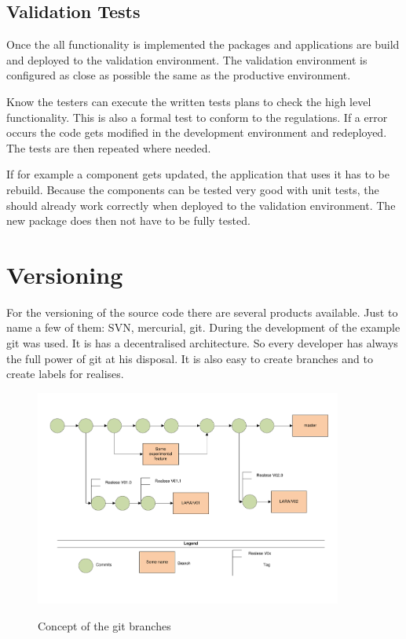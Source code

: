 \documentclass[paper=a4,twoside=false,BCOR=0mm,DIV=calc,fontsize=12pt]{scrartcl}
\begin{document}
\subsection{Validation Tests}
Once the all functionality is implemented the packages and applications are build and deployed to the validation environment. The validation environment is configured as 
close as possible the same as the productive environment.

Know the testers can execute the written tests plans to check the high level functionality. This is also a formal test to conform to the regulations. If a error occurs 
the code gets modified in the development environment and redeployed. The tests are then repeated where needed.

If for example a component gets updated, the application that uses it has to be rebuild. Because the components can be tested very good with unit tests, the should already work correctly when deployed to the validation environment.
The new package does then not have to be fully tested.

\section{Versioning}
For the versioning of the source code there are several products available. Just to name a few of them: SVN, mercurial, git.
During the development of the example git was used. It is has a decentralised architecture. So every developer has always the full power of git at his disposal. It is also easy to create branches and to create labels for realises.

\begin{figure}
    \begin{center}
       \includegraphics[width=0.9\textwidth]{./img/gitversioning.pdf}\\
    \end{center}
  \caption{Concept of the git branches}
  \label{gitbranchconcept}
\end{figure} 
\end{document}

